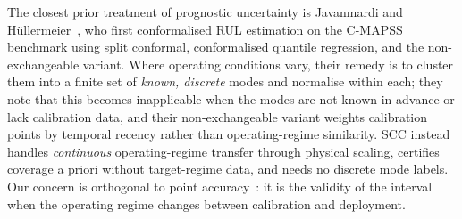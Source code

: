 The closest prior treatment of prognostic uncertainty is Javanmardi and
H\"ullermeier~\cite{javanmardi2023conformal}, who first conformalised RUL estimation on the C-MAPSS
benchmark using split conformal, conformalised quantile regression, and the non-exchangeable
variant. Where operating conditions vary, their remedy is to cluster them into a finite set of
\emph{known, discrete} modes and normalise within each; they note that this becomes inapplicable
when the modes are not known in advance or lack calibration data, and their non-exchangeable variant
weights calibration points by temporal recency rather than operating-regime similarity. SCC instead
handles \emph{continuous} operating-regime transfer through physical scaling, certifies coverage a
priori without target-regime data, and needs no discrete mode labels. Our concern is orthogonal to
point accuracy~\cite{lei2018machinery}: it is the validity of the interval when the operating regime
changes between calibration and deployment.
